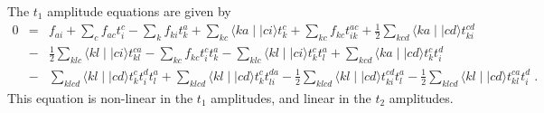 The $t_1$ amplitude equations are given by
\begin{eqnarray}
0 & = & f_{ai} + \sum_cf_{ac}t^c_i - \sum_k f_{ki}t^a_k +  
\sum_{kc}\langle ka\mid\mid ci\rangle t^c_k + \sum_{kc}f_{kc}t^{ac}_{ik}
+\frac{1}{2}\sum_{kcd}\langle ka\mid\mid cd\rangle t^{cd}_{ki} \nonumber \\
  & - & \frac{1}{2}\sum_{klc}\langle kl\mid\mid ci \rangle t^{ca}_{kl}
-\sum_{kc}f_{kc}t^c_it^a_k -\sum_{klc}\langle kl\mid\mid ci\rangle t^c_k t^a_l
+\sum_{kcd} \langle ka\mid\mid cd \rangle t^c_k t^d_i  \nonumber \\
  & - & \sum_{klcd}\langle kl\mid\mid cd\rangle t^c_kt^d_it^a_l
+ \sum_{klcd}\langle kl\mid\mid cd\rangle t^c_kt^{da}_{li}
- \frac{1}{2} \sum_{klcd}\langle kl\mid\mid cd\rangle t^{cd}_{ki}t^{a}_{l}
- \frac{1}{2} \sum_{klcd}\langle kl\mid\mid cd\rangle t^{ca}_{kl}t^{d}_{i}\;.
\label{t1_eqn}
\end{eqnarray}
This equation is non-linear in the $t_1$ amplitudes, and linear in
the $t_2$ amplitudes. 

